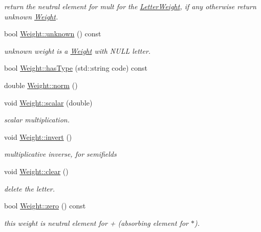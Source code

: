 \begin{DoxyCompactItemize}
\begin{DoxyCompactList}\small\item\em return the neutral element for mult for the \mbox{\hyperlink{classLetterWeight}{Letter\+Weight}}, if any otherwise return unknown \mbox{\hyperlink{classWeight}{Weight}}. \end{DoxyCompactList}\item 
\mbox{\label{group__weight_ga2185b6a5b1957fcab19bf6281adeed47}} 
bool \mbox{\hyperlink{group__weight_ga2185b6a5b1957fcab19bf6281adeed47}{Weight\+::unknown}} () const
\begin{DoxyCompactList}\small\item\em unknown weight is a \mbox{\hyperlink{classWeight}{Weight}} with N\+U\+LL letter. \end{DoxyCompactList}\item 
bool \mbox{\hyperlink{group__weight_gad236331c6f6ca8dd9fced5ffffd79f35}{Weight\+::has\+Type}} (std\+::string code) const
\item 
double \mbox{\hyperlink{group__weight_ga68bd9621500f31ba5f0fbe04dc5a00e4}{Weight\+::norm}} ()
\item 
void \mbox{\hyperlink{group__weight_ga5d63ead0a1d21ee5628c643fca773903}{Weight\+::scalar}} (double)
\begin{DoxyCompactList}\small\item\em scalar multiplication. \end{DoxyCompactList}\item 
void \mbox{\hyperlink{group__weight_gabc3309e134f0fdda38ebbcb12d350a28}{Weight\+::invert}} ()
\begin{DoxyCompactList}\small\item\em multiplicative inverse, for semifields \end{DoxyCompactList}\item 
void \mbox{\hyperlink{group__weight_gaace5b230ea1544aac7b049091e142bd3}{Weight\+::clear}} ()
\begin{DoxyCompactList}\small\item\em delete the letter. \end{DoxyCompactList}\item 
\mbox{\label{group__weight_gad0c93ac5f963b02ca3f6c1d5d02f5d61}} 
bool \mbox{\hyperlink{group__weight_gad0c93ac5f963b02ca3f6c1d5d02f5d61}{Weight\+::zero}} () const
\begin{DoxyCompactList}\small\item\em this weight is neutral element for + (absorbing element for $\ast$). \end{DoxyCompactList}\item 

\end{DoxyCompactItemize}
